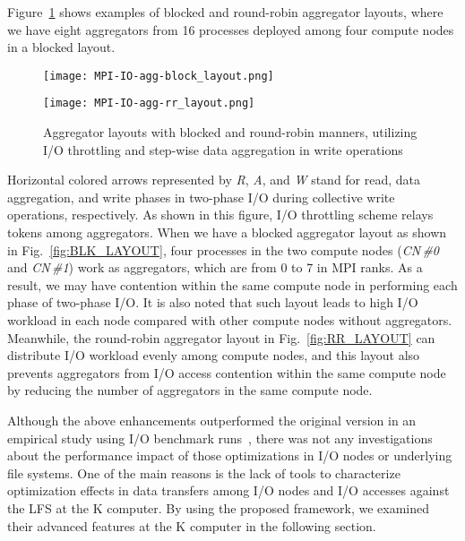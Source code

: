 \documentclass{jhps}
\begin{document}
Figure~\ref{fig:AGG_RR_LAYOUT} shows examples of blocked and round-robin
aggregator layouts, where we have eight aggregators from 16 processes
deployed among four compute nodes in a blocked layout.
%
\begin{figure}[tb]
\centering
\begin{minipage}[t]{0.36\textwidth}
\centering
\texttt{[image: MPI-IO-agg-block\_layout.png]}
\label{fig:BLK_LAYOUT}
\end{minipage}
\noindent
\begin{minipage}[t]{0.36\textwidth}
\centering
\texttt{[image: MPI-IO-agg-rr\_layout.png]}
\label{fig:RR_LAYOUT}
\end{minipage}
\caption{Aggregator layouts with blocked and round-robin manners,
utilizing I/O throttling and step-wise data aggregation in write operations}
\label{fig:AGG_RR_LAYOUT}
\end{figure}
%
Horizontal colored arrows represented by {\itshape R}, {\itshape A},
and {\itshape W} stand for
read, data aggregation, and write phases in two-phase I/O during collective write
operations, respectively.
As shown in this figure, I/O throttling scheme relays tokens among aggregators.
When we have a blocked aggregator layout as shown in
Fig.~\ref{fig:BLK_LAYOUT},
four processes in the two compute nodes ({\itshape CN\,\#0} and {\itshape CN\,\#1})
work as aggregators, which are from 0 to 7 in MPI ranks.
As a result, we may have contention within the same compute node
in performing each phase of two-phase I/O.
It is also noted that such layout leads to high I/O workload
in each node compared with other compute nodes without aggregators.
Meanwhile, the round-robin aggregator layout in
Fig.~\ref{fig:RR_LAYOUT}
can distribute I/O workload evenly
among compute nodes, and this layout also prevents aggregators
from I/O access contention within the same compute node
by reducing the number of aggregators in the same compute node.

Although the above enhancements outperformed the original version
in an empirical study using I/O benchmark runs~\cite{tsujita:WS_EuroMPI2014,tsujita:hpcasia18},
there was not any investigations about the performance impact
of those optimizations in I/O nodes or underlying file systems.
One of the main reasons is the lack of tools to characterize optimization
effects in data transfers among I/O nodes and I/O accesses
against the LFS at the K computer.
By using the proposed framework, we examined their advanced features
at the K computer in the following section.
\end{document}
